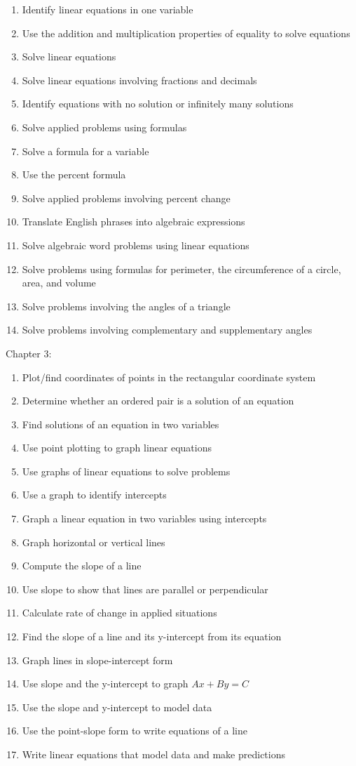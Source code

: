 \documentclass[11pt]{article}
\newenvironment{alphalist}{
  \begin{enumerate}[(1)]
    \addtolength{\itemsep}{-1.0\itemsep}}
  {\end{enumerate}}
\begin{document}
\begin{alphalist}
    \item Identify linear equations in one variable
    \item Use the addition and multiplication properties of equality to solve equations
    \item Solve linear equations
    \item Solve linear equations involving fractions and decimals
    \item Identify equations with no solution or infinitely many solutions
    \item Solve applied problems using formulas
    \item Solve a formula for a variable
    \item Use the percent formula
    \item Solve applied problems involving percent change
    \item Translate English phrases into algebraic expressions
    \item Solve algebraic word problems using linear equations
    \item Solve problems using formulas for perimeter, the circumference of a circle, area, and volume
    \item Solve problems involving the angles of a triangle
    \item Solve problems involving complementary and supplementary angles
\end{alphalist}
\noindent Chapter 3:
 \begin{alphalist}
    \item Plot/find coordinates of points in the rectangular coordinate system
    \item Determine whether an ordered pair is a solution of an equation
    \item Find solutions of an equation in two variables
    \item Use point plotting to graph linear equations
    \item Use graphs of linear equations to solve problems
    \item Use a graph to identify intercepts
    \item Graph a linear equation in two variables using intercepts
    \item Graph horizontal or vertical lines
    \item Compute the slope of a line
    \item Use slope to show that lines are parallel or perpendicular
    \item Calculate rate of change in applied situations
    \item Find the slope of a line and its y-intercept from its equation
    \item Graph lines in slope-intercept form
    \item Use slope and the y-intercept to graph $Ax + By = C$
    \item Use the slope and y-intercept to model data
    \item Use the point-slope form to write equations of a line
    \item Write linear equations that model data and make predictions
 \end{alphalist}
\end{document}
